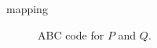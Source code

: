 mapping

\begin{figure}[ht!]

\caption{ABC code for $P$ and $Q$.}
\label{pi_simulation_ABC_code}
\end{figure}